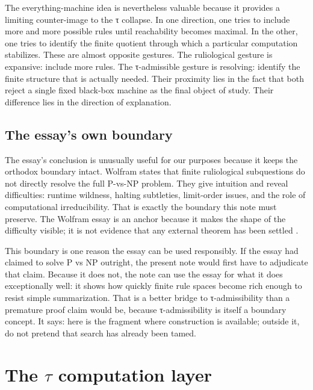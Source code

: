 \documentclass{pantarhei-researchnote}
\begin{document}
The everything-machine idea is nevertheless valuable because it provides
a limiting counter-image to the τ collapse. In one direction, one tries
to include more and more possible rules until reachability becomes
maximal. In the other, one tries to identify the finite quotient through
which a particular computation stabilizes. These are almost opposite
gestures. The ruliological gesture is expansive: include more rules. The
τ-admissible gesture is resolving: identify the finite structure that is
actually needed. Their proximity lies in the fact that both reject a
single fixed black-box machine as the final object of study. Their
difference lies in the direction of explanation.

\subsection{The essay's own boundary}

The essay's conclusion is unusually useful for our purposes because it
keeps the orthodox boundary intact. Wolfram states that finite
ruliological subquestions do not directly resolve the full P-vs-NP
problem. They give intuition and reveal difficulties: runtime wildness,
halting subtleties, limit-order issues, and the role of computational
irreducibility. That is exactly the boundary this note must preserve. The
Wolfram essay is an anchor because it makes the shape of the difficulty
visible; it is not evidence that any external theorem has been settled
\cite{Wolfram2026RuliologicalPNP}.

This boundary is one reason the essay can be used responsibly. If the
essay had claimed to solve P vs NP outright, the present note would first
have to adjudicate that claim. Because it does not, the note can use the
essay for what it does exceptionally well: it shows how quickly finite
rule spaces become rich enough to resist simple summarization. That is a
better bridge to τ-admissibility than a premature proof claim would be,
because τ-admissibility is itself a boundary concept. It says: here is
the fragment where construction is available; outside it, do not pretend
that search has already been tamed.

\section{The \texorpdfstring{$\tau$}{tau} computation layer}
\label{sec:tau-layer}
\end{document}
